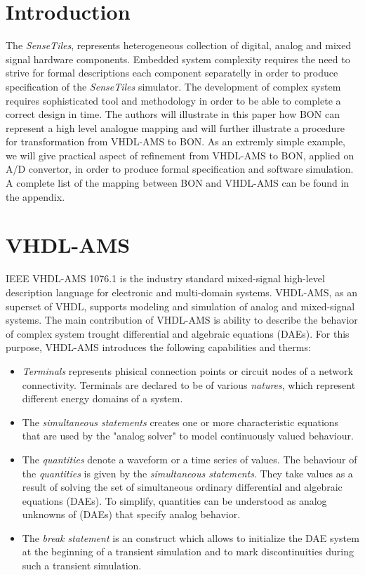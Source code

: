 \documentclass{article}
\newcommand{\STs}{\emph{SenseTiles}\xspace}
\begin{document}
\section{Introduction}
The \STs, represents heterogeneous collection of digital, analog 
and mixed signal hardware components. Embedded system complexity 
requires the need to strive for formal descriptions each component 
separatelly in order to produce specification of the \STs simulator. 
The development of complex system requires sophisticated tool and methodology 
in order to be able to complete a correct design in time.  
The authors will illustrate in this paper how BON can represent a high 
level analogue mapping and will further illustrate a procedure for 
transformation from VHDL-AMS to BON. As an extremly simple example, 
we will give practical aspect of refinement from VHDL-AMS to BON,
applied on A/D convertor, in order to produce formal specification 
and software simulation. A complete list of the mapping between BON 
and VHDL-AMS can be found in the appendix.


\section{VHDL-AMS}
IEEE VHDL-AMS 1076.1 is the industry standard mixed-signal 
high-level description language for electronic and multi-domain 
systems. VHDL-AMS, as an superset of VHDL, supports modeling and 
simulation of analog and mixed-signal systems. The main contribution 
of VHDL-AMS is ability to describe the behavior of complex system 
trought differential and algebraic equations (DAEs). For this purpose, 
VHDL-AMS introduces the following capabilities and therms:

\begin{itemize}
\item 
\emph{Terminals} represents phisical connection points or circuit nodes 
of a network connectivity. Terminals are declared to be of various 
\emph{natures}, which represent different energy domains of a system.
\item
The \emph{simultaneous statements} creates one or more characteristic 
equations that are used by the "analog solver" to model continuously 
valued behaviour.  
\item
The \emph{quantities} denote a waveform or a time series of values.
The behaviour of the \emph{quantities} is given by the \emph{simultaneous
 statements}. They take values as a result of solving the set of simultaneous 
ordinary differential and algebraic equations (DAEs). To simplify, 
quantities can be understood as analog unknowns of (DAEs) that specify 
analog behavior. 
\item
The \emph{break statement} is an construct which allows to 
initialize the DAE system at the beginning of a transient 
simulation and to mark discontinuities during such a transient 
simulation.

\end{itemize} 
 
\end{document}
